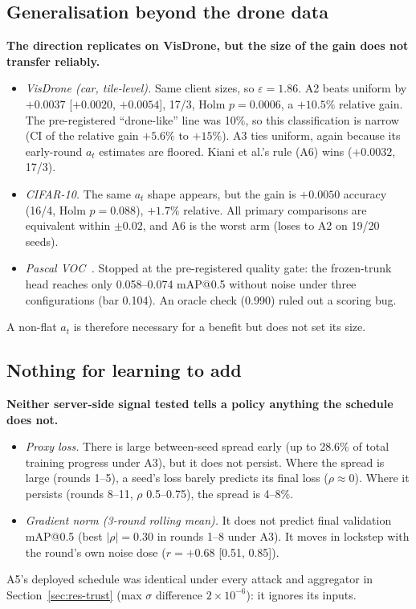 \documentclass[journal]{IEEEtran}
\makeatletter
\newcommand{\eps}{\varepsilon}
\newcommand{\mAP}{mAP@0.5}
\makeatother
\begin{document}
\subsection{Generalisation beyond the drone data}
\textbf{The direction replicates on VisDrone, but the size of the gain does not transfer reliably.}
\begin{itemize}
  \item \emph{VisDrone (car, tile-level).} Same client sizes, so $\eps = 1.86$. A2 beats uniform by
  $+0.0037$ [$+0.0020$, $+0.0054$], 17/3, Holm $p = 0.0006$, a $+10.5\%$ relative gain. The
  pre-registered ``drone-like'' line was 10\%, so this classification is narrow (CI of the relative
  gain $+5.6\%$ to $+15\%$). A3 ties uniform, again because its early-round $a_t$ estimates are
  floored. Kiani et al.'s rule (A6) wins ($+0.0032$, 17/3).
  \item \emph{CIFAR-10.} The same $a_t$ shape appears, but the gain is $+0.0050$ accuracy (16/4,
  Holm $p = 0.088$), $+1.7\%$ relative. All primary comparisons are equivalent within $\pm0.02$, and
  A6 is the worst arm (loses to A2 on 19/20 seeds).
  \item \emph{Pascal VOC~\cite{everingham2010voc}.} Stopped at the pre-registered quality gate: the
  frozen-trunk head reaches only 0.058--0.074 \mAP{} without noise under three configurations (bar
  0.104). An oracle check (0.990) ruled out a scoring bug.
\end{itemize}
A non-flat $a_t$ is therefore necessary for a benefit but does not set its size.

\subsection{Nothing for learning to add}
\label{sec:res-learn}
\textbf{Neither server-side signal tested tells a policy anything the schedule does not.}
\begin{itemize}
  \item \emph{Proxy loss.} There is large between-seed spread early (up to 28.6\% of total training
  progress under A3), but it does not persist. Where the spread is large (rounds 1--5), a seed's loss
  barely predicts its final loss ($\rho \approx 0$). Where it persists (rounds 8--11, $\rho$ 0.5--0.75),
  the spread is 4--8\%.
  \item \emph{Gradient norm (3-round rolling mean).} It does not predict final validation \mAP{}
  (best $|\rho| = 0.30$ in rounds 1--8 under A3). It moves in lockstep with the round's own noise dose
  ($r = +0.68$ [0.51, 0.85]).
\end{itemize}
A5's deployed schedule was identical under every attack and aggregator in Section~\ref{sec:res-trust}
(max $\sigma$ difference $2\times10^{-6}$): it ignores its inputs.
\end{document}
